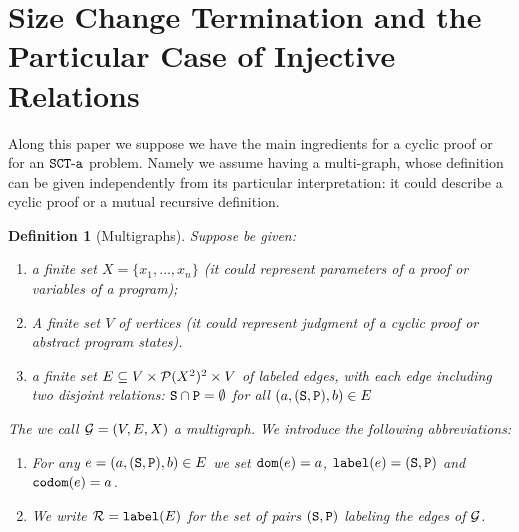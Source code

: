 \documentclass{lmcs}
\newtheorem{definition}[theorem]{Definition}
\begin{document}
\section{Size Change Termination and the Particular Case of Injective Relations}
\label{section-SCT}

Along this paper we suppose we have the main ingredients for a cyclic proof
or for an ${\tt SCT\mbox{-}a}$ problem.
Namely we assume having a multi-graph, whose definition can be given independently
from its particular interpretation: it could describe
a cyclic proof or a mutual recursive definition.


\begin{definition}[Multigraphs]
\label{definition-multigraph}
Suppose be given:

\begin{enumerate}
\item
a \emph{finite set} $X = \{ x_1, \ldots, x_n \} $
 (it could represent parameters of a proof or variables of a program);

\item
A finite set $V$ of vertices
 (it could represent judgment of a cyclic proof or abstract program states).


\item
a finite set 
$E \subseteq V \times {\mathcal P}(X^2)^2 \times V$ of labeled edges,
with each edge including two disjoint relations:
 \emph{${\tt S} \cap {\tt P} = \emptyset$ for all $(a,({\tt S}, {\tt P}),b) \in E$}
\end{enumerate}

The we call ${\mathcal G}= (V,E,X)$ a multigraph. We introduce the following abbreviations:

\begin{enumerate}
\item
For any $e = (a, ({\tt S}, {\tt P}), b) \in E$ we set  
${\tt dom}(e) = a$, ${\tt label}(e) = ({\tt S}, {\tt P})$ and ${\tt codom}(e) = a$.

\item
We write ${\mathcal R} = {\tt label}(E)$ for the set of pairs $({\tt S}, {\tt P})$ 
labeling the edges of ${\mathcal G}$.
\end{enumerate}
\end{definition}
\end{document}
